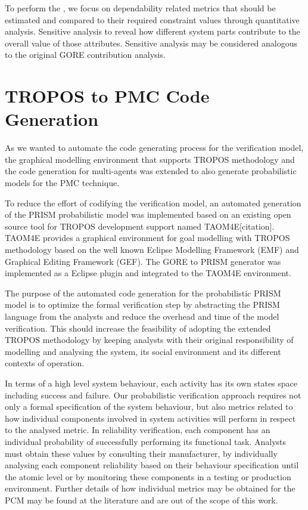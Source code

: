 To perform the , we focus on dependability related metrics that should be estimated and compared to their required constraint values through quantitative analysis. Sensitive analysis to reveal how different system parts contribute to the overall value of those attributes. Sensitive analysis may be considered analogous to the original GORE contribution analysis.



\section{TROPOS to PMC Code Generation}

As we wanted to automate the code generating process for the verification model, the graphical modelling environment that supports TROPOS methodology and the code generation for multi-agents was extended to also generate probabilistic models for the PMC technique.

To reduce the effort of codifying the verification model, an automated generation of the PRISM probabilistic model was implemented based on an existing open source tool for TROPOS development support named TAOM4E[citation]. TAOM4E provides a graphical environment for goal modelling with TROPOS methodology based on the well known Eclipse Modelling Framework (EMF) and Graphical Editing Framework (GEF). The GORE to PRISM generator was implemented as a Eclipse plugin and integrated to the TAOM4E environment. 

The purpose  of the automated code generation for the probabilistic PRISM model is to optimize the formal verification step by abstracting the PRISM language from the analysts and reduce the overhead and time of the model verification. This should increase the feasibility of adopting the extended TROPOS methodology by keeping analysts with their original responsibility of modelling and analysing the system, its social environment and its different contexts of operation.





In terms of a high level system behaviour, each activity has its own states space including success and failure. Our probabilistic verification approach requires not only a formal specification of the system behaviour, but also metrics related to how individual components involved in system activities will perform in respect to the analysed metric. In reliability verification, each component has an individual probability of successfully performing its functional task. Analysts must obtain these values by consulting their manufacturer, by individually analysing each component reliability based on their behaviour specification until the atomic level or by monitoring these components in a testing or production environment. Further details of how individual metrics may be obtained for the PCM may be found at the literature and are out of the scope of this work.
